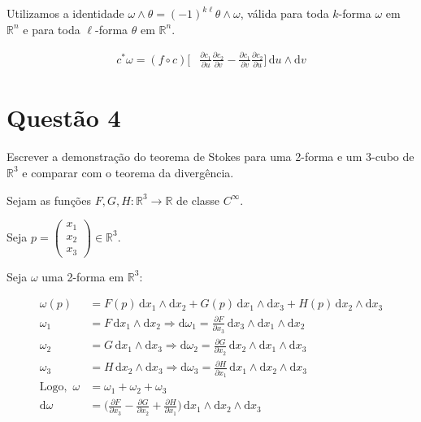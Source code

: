 \documentclass[12pt,a4paper]{article}
\begin{document}
		Utilizamos a identidade $\omega \wedge \theta = (-1)^{k\ell} \theta \wedge \omega$, v\'alida para toda $k$-forma $\omega$ em $\mathbb{R}^n$ e para toda $\ell$-forma $\theta$ em $\mathbb{R}^n$.
		
		\begin{align}
			c^*\omega = (f \circ c) \biggl[ &\frac{\partial c_1}{\partial u} \frac{\partial c_2}{\partial v}
			- \frac{\partial c_1}{\partial v} \frac{\partial c_2}{\partial u} \biggl] \,\mathrm{d}u \wedge \mathrm{d}v 
		\end{align}		

	\section{Quest\~ao 4}
		\begin{flushright}
		\end{flushright}
		
		Escrever a demonstra\c{c}\~ao do teorema de Stokes para uma 2-forma e um 3-cubo de $\mathbb{R}^3$ e comparar com o teorema da diverg\^encia.

		\begin{flushright}
		\end{flushright}

		Sejam as fun\c{c}\~oes $F, G, H : \mathbb{R}^3 \rightarrow \mathbb{R}$ de classe $C^\infty$.
		
		Seja $p = \begin{pmatrix} x_1 \\ x_2 \\ x_3 \end{pmatrix} \in \mathbb{R}^3$.
		
		Seja $\omega$ uma 2-forma em $\mathbb{R}^3$:
		
		\begin{align}
			\omega(p) &= F(p) \,\mathrm{d}x_1 \wedge \mathrm{d}x_2 + G(p) \,\mathrm{d}x_1 \wedge \mathrm{d}x_3 + H(p) \,\mathrm{d}x_2 \wedge \mathrm{d}x_3 \label{DefinaOmega} \\
			\omega_1 &= F \,\mathrm{d}x_1 \wedge\mathrm{d}x_2 \Rightarrow \mathrm{d}\omega_1 = \frac{\partial F}{\partial x_3} \,\mathrm{d}x_3 \wedge\mathrm{d}x_1 \wedge\mathrm{d}x_2 \\
			\omega_2 &= G \,\mathrm{d}x_1 \wedge\mathrm{d}x_3 \Rightarrow \mathrm{d}\omega_2 = \frac{\partial G}{\partial x_2} \,\mathrm{d}x_2 \wedge\mathrm{d}x_1 \wedge\mathrm{d}x_3 \\
			\omega_3 &= H \,\mathrm{d}x_2 \wedge\mathrm{d}x_3 \Rightarrow \mathrm{d}\omega_3 = \frac{\partial H}{\partial x_1} \,\mathrm{d}x_1 \wedge\mathrm{d}x_2 \wedge\mathrm{d}x_3 \\
			\mathrm {Logo,\,\,} \omega &= \omega_1 + \omega_2 + \omega_3 \label{DecomposicaoOmega} \\
			\mathrm{d}\omega &= \biggl( \frac{\partial F}{\partial x_3} - \frac{\partial G}{\partial x_2} + \frac{\partial H}{\partial x_1} \biggl) \,\mathrm{d}x_1 \wedge\mathrm{d}x_2 \wedge\mathrm{d}x_3
		\end{align}
	
\end{document}
